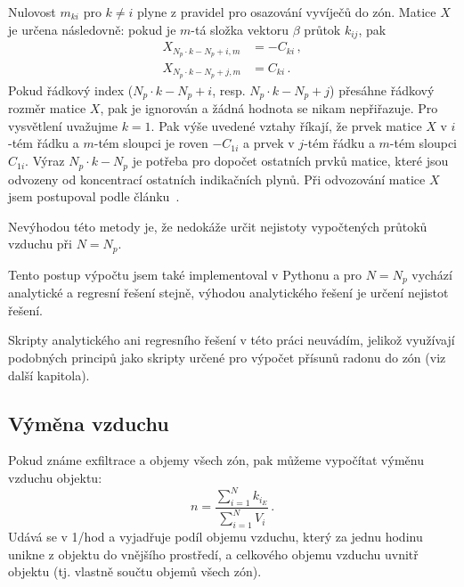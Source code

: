 Nulovost $m_{ki}$ pro $k\neq i$ plyne z pravidel pro osazování vyvíječů do zón. Matice $X$ je určena následovně: pokud je $m$-tá složka vektoru $\beta$ průtok $k_{ij}$, pak 
\begin{align}
    X_{N_p\cdot k-N_p+i,m}&=-C_{ki}\,,\\
    X_{N_p\cdot k-N_p+j,m}&=C_{ki}\,.
\end{align}
Pokud řádkový index ($N_p\cdot k-N_p+i$, resp. $N_p\cdot k-N_p+j$) přesáhne řádkový rozměr matice $X$, pak je ignorován a žádná hodnota se nikam nepřiřazuje. Pro vysvětlení uvažujme $k=1$. Pak výše uvedené vztahy říkají, že prvek matice $X$ v $i$-tém řádku a $m$-tém sloupci je roven $-C_{1i}$ a prvek v $j$-tém řádku a $m$-tém sloupci $C_{1i}$. Výraz $N_p\cdot k-N_p$ je potřeba pro dopočet ostatních prvků matice, které jsou odvozeny od koncentrací ostatních indikačních plynů. Při odvozování matice $X$ jsem postupoval podle článku~\cite{japonci2}.

Nevýhodou této metody je, že nedokáže určit nejistoty vypočtených průtoků vzduchu při $N=N_{p}$. 

Tento postup výpočtu jsem také implementoval v Pythonu a pro $N=N_{p}$ vychází analytické a regresní řešení stejně, výhodou analytického řešení je určení nejistot řešení. 

Skripty analytického ani regresního řešení v této práci neuvádím, jelikož využívají podobných principů jako skripty určené pro výpočet přísunů radonu do zón (viz další kapitola).

\subsection{Výměna vzduchu}
Pokud známe exfiltrace a objemy všech zón, pak můžeme vypočítat výměnu vzduchu objektu:
\begin{equation}
    n=\frac{\sum_{i=1}^N k_{i_E}}{\sum_{i=1}^N V_i}\,.
    \label{eq:prutoky_n}
\end{equation}
Udává se v \si{1/hod} a vyjadřuje podíl objemu vzduchu, který za jednu hodinu unikne z objektu do vnějšího prostředí, a celkového objemu vzduchu uvnitř objektu (tj. vlastně součtu objemů všech zón).

